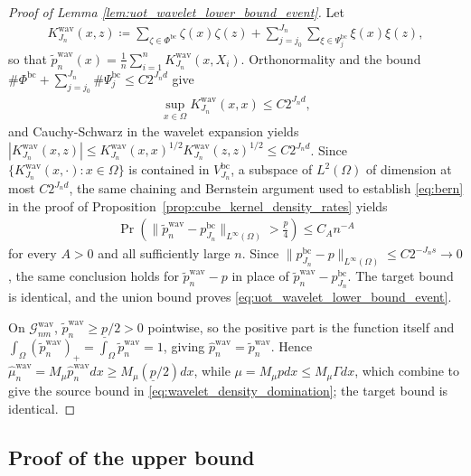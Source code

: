 \documentclass[11pt,reqno]{amsart}
\theoremstyle{definition}
\renewcommand{\hat}{\widehat}
\renewcommand{\tilde}{\widetilde}
\begin{document}
\begin{proof}[Proof of Lemma \ref{lem:uot_wavelet_lower_bound_event}]
Let
\begin{align*}
    K_{J_n}^{\mathrm{wav}}(x,z)
    \coloneqq
    \sum_{\zeta\in\Phi^{\mathrm{bc}}}\zeta(x)\zeta(z)
    + \sum_{j=j_0}^{J_n}\sum_{\xi\in\Psi_j^{\mathrm{bc}}}\xi(x)\xi(z),
\end{align*}
so that $\tilde p_n^{\mathrm{wav}}(x) = \tfrac{1}{n}\sum_{i=1}^n K_{J_n}^{\mathrm{wav}}(x,X_i)$. Orthonormality and the bound $\#\Phi^{\mathrm{bc}}+\sum_{j=j_0}^{J_n}\#\Psi_j^{\mathrm{bc}}\le C 2^{J_nd}$ give
\begin{align*}
    \sup_{x\in\Omega} K_{J_n}^{\mathrm{wav}}(x,x) \le C 2^{J_nd},
\end{align*}
and Cauchy-Schwarz in the wavelet expansion yields $|K_{J_n}^{\mathrm{wav}}(x,z)|\le K_{J_n}^{\mathrm{wav}}(x,x)^{1/2}K_{J_n}^{\mathrm{wav}}(z,z)^{1/2}\le C 2^{J_nd}$. Since $\{K_{J_n}^{\mathrm{wav}}(x,\cdot):x\in\Omega\}$ is contained in $V_{J_n}^{\mathrm{bc}}$, a subspace of $L^2(\Omega)$ of dimension at most $C2^{J_nd}$, the same chaining and Bernstein argument used to establish \eqref{eq:bern} in the proof of Proposition~\ref{prop:cube_kernel_density_rates} yields
\begin{align*}
    \Pr\left(
        \|\tilde p_n^{\mathrm{wav}}-p_{J_n}^{\mathrm{bc}}\|_{L^\infty(\Omega)}
        > \frac{\underline p}{4}
    \right)
    \le C_A n^{-A}
\end{align*}
for every $A>0$ and all sufficiently large $n$. Since $\|p_{J_n}^{\mathrm{bc}}-p\|_{L^\infty(\Omega)}\le C 2^{-J_n s}\to 0$, the same conclusion holds for $\tilde p_n^{\mathrm{wav}}-p$ in place of $\tilde p_n^{\mathrm{wav}}-p_{J_n}^{\mathrm{bc}}$. The target bound is identical, and the union bound proves \eqref{eq:uot_wavelet_lower_bound_event}.

On $\mathcal G_{nm}^{\mathrm{wav}}$, $\tilde p_n^{\mathrm{wav}}\ge \underline p/2>0$ pointwise, so the positive part is the function itself and $\int_{\Omega}(\tilde p_n^{\mathrm{wav}})_+=\int_{\Omega}\tilde p_n^{\mathrm{wav}}=1$, giving $\hat p_n^{\mathrm{wav}}=\tilde p_n^{\mathrm{wav}}$. Hence $\hat\mu_n^{\mathrm{wav}}=M_\mu\hat p_n^{\mathrm{wav}}dx\ge M_\mu(\underline p/2)dx$, while $\mu = M_\mu p dx\le M_\mu \Gamma dx$, which combine to give the source bound in \eqref{eq:wavelet_density_domination}; the target bound is identical.
\end{proof}


\subsection{Proof of the upper bound}
\end{document}
